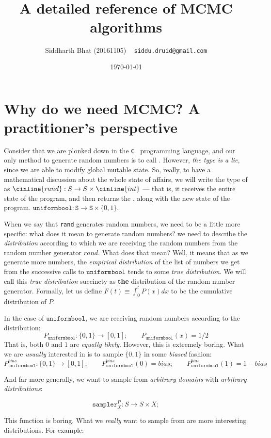 \documentclass[titlepage]{article}
\title{A detailed reference of MCMC algorithms}
\author{Siddharth Bhat (20161105) ~ \texttt{siddu.druid@gmail.com}}
\date{\today}
\renewcommand{\S}{\texttt{S}}
\newcommand{\zo}{\{0, 1\}}
\newcommand{\uniformbool}{\texttt{uniformbool}}
\begin{document}
\maketitle
\section{Why do we need MCMC? A practitioner's perspective}
Consider that we are plonked down in the \texttt{C } programming language, and
our only method to generate random numbers is to call .
However, \emph{the type is a lie}, since we are able to modify global mutable
state. So, really, to have a mathematical discussion about the whole state
of affairs, we will write the type of  as
$\cinline{rand}: S \rightarrow S \times \cinline{int}$ --- that is,
it receives the entire state of the program, and then returns the ,
along with the new state of the program.
$\uniformbool: \S \rightarrow \S \times \zo$.

When we say that \texttt{rand} generates random numbers, we need to be a
little more specific: what does it mean to generate random numbers? we need to
describe the \emph{distribution} according to which we are receiving the random
numbers from the random number generator $rand$.  What does that mean?
Well, it means that as we generate more numbers, the \emph{empirical distribution}
of the list of numbers we get from the successive calls to $\uniformbool$ tends
to some \emph{true distribution}. We will call this \emph{true distribution}
succincty as \textbf{the} distribution of the random number generator. Formally,
let us define $F(t) \equiv \int_0^t P(x) dx$ to be the cumulative distribution 
of $P$.

In the case of 
$\uniformbool$, we are receiving random numbers according to the distribution:
$$
P_{\uniformbool}: \zo \rightarrow [0, 1]; \qquad P_{\uniformbool}(x) = 1/2
$$
That is, both $0$ and $1$ are \emph{equally likely}. However, this is
extremely boring. What we are \emph{usually} interested in is to sample $\{0, 1\}$
in some \emph{biased} fashion:
$$
P_{\uniformbool}^{bias}: \zo \rightarrow [0, 1]; 
\qquad P_{\uniformbool}^{bias}(0) = bias;
\qquad P_{\uniformbool}^{bias}(1) = 1 - bias
$$

And far more generally, we want to sample from \emph{arbitrary domains} with
\emph{arbitrary distributions}:

$$
\texttt{sampler}_X^P: S \rightarrow S \times X; 
$$

This function is boring. What we \emph{really} want to sample from are
more interesting distributions. For example:
\end{document}
